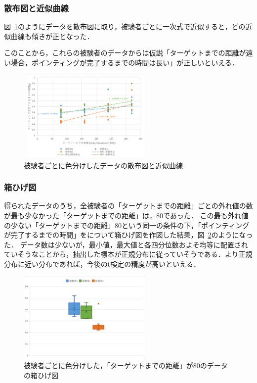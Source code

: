 \documentclass[a4paper, papersize, titlepage]{jsarticle}
\begin{document}
\begin{multicols}{2}
\subsubsection{散布図と近似曲線}
図~\ref{plot}のようにデータを散布図に取り，被験者ごとに一次式で近似すると，どの近似曲線も傾きが正となった．

このことから，これらの被験者のデータからは仮説「ターゲットまでの距離が遠い場合，ポインティングが完了するまでの時間は長い」が正しいといえる．

\renewcommand{\figurename}{図}
\begin{figure}[H]
 \centering
   \includegraphics[width=65mm]{plot.png}
 \caption{被験者ごとに色分けしたデータの散布図と近似曲線}
 \label{plot}
\end{figure}
\noindent

\subsubsection{箱ひげ図}
得られたデータのうち，全被験者の「ターゲットまでの距離」ごとの外れ値の数が最も少なかった「ターゲットまでの距離」は，80であった．
この最も外れ値の少ない「ターゲットまでの距離」80という同一の条件の下，「ポインティングが完了するまでの時間」をについて箱ひげ図を作図した結果，図~\ref{hige}のようになった．
データ数は少ないが，最小値，最大値と各四分位数およそ均等に配置されていそうなことから，抽出した標本が正規分布に従っていそうである．より正規分布に近い分布であれば，今後のt検定の精度が高いといえる．

\begin{figure}[H]
 \centering
   \includegraphics[width=65mm]{hige.png}
 \caption{被験者ごとに色分けした，「ターゲットまでの距離」が80のデータの箱ひげ図}
 \label{hige}
\end{figure}
\noindent



\end{multicols}
\end{document}
